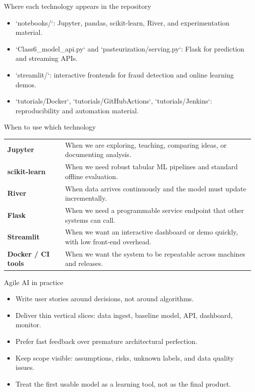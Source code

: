 \begin{frame}{Where each technology appears in the repository}
\begin{itemize}
\item `notebooks/`: Jupyter, pandas, scikit-learn, River, and experimentation material.
\item `Class6_model_api.py` and `pasteurization/serving.py`: Flask for prediction and streaming APIs.
\item `streamlit/`: interactive frontends for fraud detection and online learning demos.
\item `tutorials/Docker`, `tutorials/GitHubActions`, `tutorials/Jenkins`: reproducibility and automation material.
\end{itemize}
\coursefooter
\end{frame}

\begin{frame}{When to use which technology}
\begin{tabularx}{\textwidth}{>{\bfseries}l X}
Jupyter & When we are exploring, teaching, comparing ideas, or documenting analysis. \\
scikit-learn & When we need robust tabular ML pipelines and standard offline evaluation. \\
River & When data arrives continuously and the model must update incrementally. \\
Flask & When we need a programmable service endpoint that other systems can call. \\
Streamlit & When we want an interactive dashboard or demo quickly, with low front-end overhead. \\
Docker / CI tools & When we want the system to be repeatable across machines and releases. \\
\end{tabularx}
\coursefooter
\end{frame}

\begin{frame}{Agile AI in practice}
\begin{itemize}
\item Write user stories around decisions, not around algorithms.
\item Deliver thin vertical slices: data ingest, baseline model, API, dashboard, monitor.
\item Prefer fast feedback over premature architectural perfection.
\item Keep scope visible: assumptions, risks, unknown labels, and data quality issues.
\item Treat the first usable model as a learning tool, not as the final product.
\end{itemize}
\coursefooter
\end{frame}

